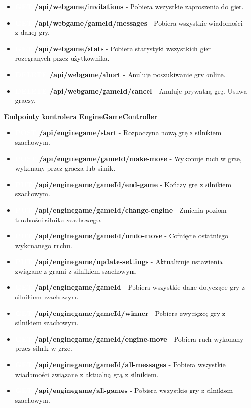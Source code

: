 \documentclass[twoside]{projektInzynierskiMS1}
\begin{document}
\begin{itemize}
    \item \textbf{\colorbox{cyan!90}{\textcolor{white}{GET}} /api/webgame/invitations} - Pobiera wszystkie zaproszenia do gier. 
    \item \textbf{\colorbox{cyan!90}{\textcolor{white}{GET}} /api/webgame/{gameId}/messages} - Pobiera wszystkie wiadomości z danej gry. 
    \item \textbf{\colorbox{cyan!90}{\textcolor{white}{GET}} /api/webgame/stats} - Pobiera statystyki wszystkich gier rozegranych przez użytkownika. 
    \item \textbf{\colorbox{red!90}{\textcolor{white}{DELETE}} /api/webgame/abort} - Anuluje poszukiwanie gry online. 
    \item \textbf{\colorbox{red!90}{\textcolor{white}{DELETE}} /api/webgame/{gameId}/cancel} - Anuluje prywatną grę. Usuwa graczy. 
\end{itemize}

\newpage

\noindent  \textbf{Endpointy kontrolera EngineGameController}
\begin{itemize} 
    \setlength\itemsep{0cm}
    \item \textbf{\colorbox{green!90}{\textcolor{white}{POST}} /api/enginegame/start} - Rozpoczyna nową grę z silnikiem szachowym. 
    \item \textbf{\colorbox{green!90}{\textcolor{white}{POST}} /api/enginegame/{gameId}/make-move} - Wykonuje ruch w grze, wykonany przez gracza lub silnik.
    \item \textbf{\colorbox{orange!90}{\textcolor{white}{PUT}} /api/enginegame/{gameId}/end-game} - Kończy grę z silnikiem szachowym. 
    \item \textbf{\colorbox{orange!90}{\textcolor{white}{PUT}} /api/enginegame/{gameId}/change-engine} - Zmienia poziom trudności silnika szachowego. 
    \item \textbf{\colorbox{orange!90}{\textcolor{white}{PUT}} /api/enginegame/{gameId}/undo-move} - Cofnięcie ostatniego wykonanego ruchu. 
    \item \textbf{\colorbox{orange!90}{\textcolor{white}{PUT}} /api/enginegame/update-settings} - Aktualizuje ustawienia związane z grami z silnikiem szachowym. 
    \item \textbf{\colorbox{cyan!90}{\textcolor{white}{GET}} /api/enginegame/{gameId}} - Pobiera wszystkie dane dotyczące gry z silnikiem szachowym.
    \item \textbf{\colorbox{cyan!90}{\textcolor{white}{GET}} /api/enginegame/{gameId}/winner} - Pobiera zwycięzcę gry z silnikiem szachowym. 
    \item \textbf{\colorbox{cyan!90}{\textcolor{white}{GET}} /api/enginegame/{gameId}/engine-move} - Pobiera ruch wykonany przez silnik w grze. 
    \item \textbf{\colorbox{cyan!90}{\textcolor{white}{GET}} /api/enginegame/{gameId}/all-messages} - Pobiera wszystkie wiadomości związane z aktualną grą z silnikiem. 
    \item \textbf{\colorbox{cyan!90}{\textcolor{white}{GET}} /api/enginegame/all-games} - Pobiera wszystkie gry z silnikiem szachowym. 
\end{itemize}
\end{document}
